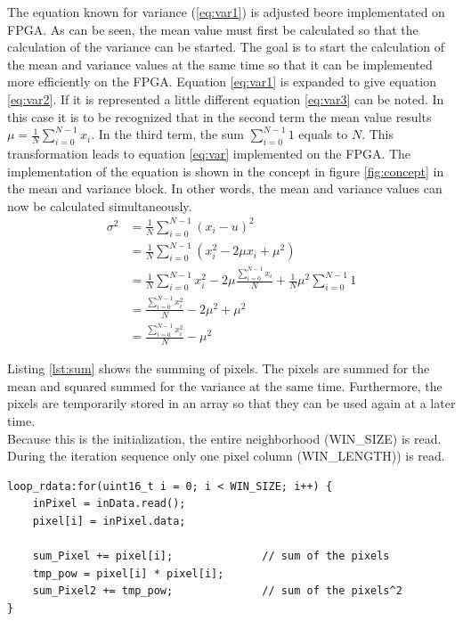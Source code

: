 The equation known for variance (\ref{eq:var1}) is adjusted beore implementated
on FPGA.
As can be seen, the mean value must first be calculated so that the calculation of the
variance can be started. The goal is to start the calculation of the mean
and variance values at the same time so that it can be implemented more
efficiently on the FPGA.
Equation \ref{eq:var1} is expanded to give equation \ref{eq:var2}. If
it is represented a little different equation 
\ref{eq:var3} can be noted. In this case it is to be recognized that in the second term the
mean value results $\mu = \frac{1}{N} \sum_{i = 0}^{N - 1} x_{i}$. In the third term,
the sum $\sum_{i = 0}^{N - 1} 1$ equals to $N$.
This transformation leads to equation \ref{eq:var} implemented on the FPGA. The
implementation of the equation is shown in the concept in figure \ref{fig:concept} in the mean and variance block. In other words, the mean and variance values can now be calculated simultaneously.
\begin{align}
    \sigma^{2} & = \frac{1}{N} \sum_{i = 0}^{N - 1} (x_{i} - u)^{2} \label{eq:var1}\\ 
    		& = \frac{1}{N} \sum_{i = 0}^{N - 1} (x_{i}^{2} - 2 \mu x_{i} + \mu^{2})  \label{eq:var2}\\
    		& = \frac{1}{N} \sum_{i = 0}^{N - 1} x_{i}^{2} - 2\mu \frac{\sum_{i = 0}^{N - 1} x_{i}}{N} + \frac{1}{N} \mu^{2} \sum_{i = 0}^{N - 1} 1 \label{eq:var3}\\
    		& = \frac{\sum_{i = 0}^{N - 1} x_{i}^{2}}{N}  - 2\mu^{2} + \mu^{2} \label{eq:var4}\\
    		& = \frac{\sum_{i = 0}^{N - 1} x_{i}^{2}}{N}  - \mu^{2}
    \label{eq:var}
\end{align}

\pagebreak
Listing \ref{lst:sum} shows the summing of pixels. The pixels are summed for the mean and squared summed for the variance at the same time. Furthermore, the pixels are temporarily stored in an array so that they can be used again at a later time. \\
Because this is the initialization, the entire neighborhood (WIN\_SIZE) is read. During the iteration sequence only one pixel column (WIN\_LENGTH)) is read. \\
\begin{minipage}{\textwidth}
\begin{lstlisting}[style=CStyle, caption=Calculation of the sum, label=lst:sum]
loop_rdata:for(uint16_t i = 0; i < WIN_SIZE; i++) {
	inPixel = inData.read();
	pixel[i] = inPixel.data;

	sum_Pixel += pixel[i];				// sum of the pixels
	tmp_pow = pixel[i] * pixel[i];
	sum_Pixel2 += tmp_pow;				// sum of the pixels^2
}
\end{lstlisting}
\end{minipage}

